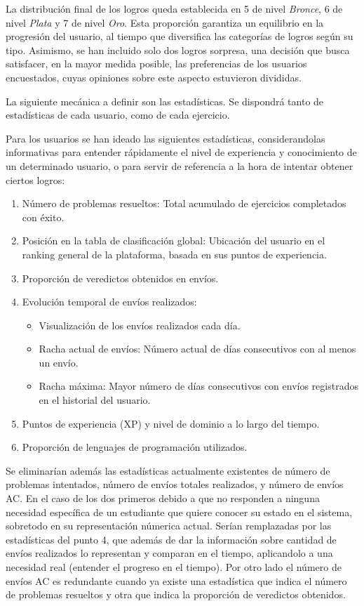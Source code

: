 La distribución final de los logros queda establecida en 5 de nivel \textit{Bronce}, 6 de nivel \textit{Plata} y 7 de nivel \textit{Oro}. Esta proporción garantiza un equilibrio en la progresión del usuario, al tiempo que diversifica las categorías de logros según su tipo. Asimismo, se han incluido solo dos logros sorpresa, una decisión que busca satisfacer, en la mayor medida posible, las preferencias de los usuarios encuestados, cuyas opiniones sobre este aspecto estuvieron divididas.

La siguiente mecánica a definir son las estadísticas. Se dispondrá tanto de estadísticas de cada usuario, como de cada ejercicio. 

Para los usuarios se han ideado las siguientes estadísticas, considerandolas informativas para entender rápidamente el nivel de experiencia y conocimiento de un determinado usuario, o para servir de referencia a la hora de intentar obtener ciertos logros:

\begin{enumerate}
    \item Número de problemas resueltos: Total acumulado de ejercicios completados con éxito.
    \item Posición en la tabla de clasificación global: Ubicación del usuario en el ranking general de la plataforma, basada en sus puntos de experiencia.
    \item Proporción de veredictos obtenidos en envíos.
    \item Evolución temporal de envíos realizados: 
    \begin{itemize}
        \item Visualización de los envíos realizados cada día.
        \item Racha actual de envíos: Número actual de días consecutivos con al menos un envío.
        \item Racha máxima: Mayor número de días consecutivos con envíos registrados en el historial del usuario.
    \end{itemize}
    \item Puntos de experiencia (XP) y nivel de dominio a lo largo del tiempo.
    \item Proporción de lenguajes de programación utilizados.
\end{enumerate}
Se eliminarían además las estadísticas actualmente existentes de número de problemas intentados, número de envíos totales realizados, y número de envíos AC. En el caso de los dos primeros debido a que no responden a ninguna necesidad específica de un estudiante que quiere conocer su estado en el sistema, sobretodo en su representación númerica actual. Serían remplazadas por las estadísticas del punto 4, que además de dar la información sobre cantidad de envíos realizados lo representan y comparan en el tiempo, aplicandolo a una necesidad real (entender el progreso en el tiempo). Por otro lado el número de envíos AC es redundante cuando ya existe una estadística que indica el número de problemas resueltos y otra que indica la proporción de veredictos obtenidos.

